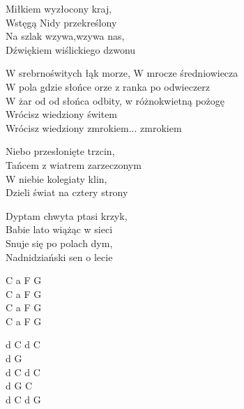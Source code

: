 \begin{text}
    Miłkiem wyzłocony kraj,\\
    Wstęgą Nidy przekreślony\\
    Na szlak wzywa,wzywa nas,\\
    Dźwiękiem wiślickiego dzwonu

    W srebrnoświtych łąk morze, W mrocze średniowiecza\\
    W pola gdzie słońce orze z ranka po odwieczerz\\
    W żar od od słońca odbity, w różnokwietną pożogę\\
    Wrócisz wiedziony świtem\\
    Wrócisz wiedziony zmrokiem... zmrokiem


    Niebo przesłonięte trzcin,\\
    Tańcem z wiatrem zarzeczonym\\
    W niebie kolegiaty klin,\\
    Dzieli świat na cztery strony

    Dyptam chwyta ptasi krzyk,\\
    Babie lato wiążąc w sieci\\
    Snuje się po polach dym,\\
    Nadnidziański sen o lecie
\end{text}
\begin{chord}
    C a F G\\
    C a F G\\
    C a F G\\
    C a F G

    d C d C\\
    d G\\
    d C d C\\
    d G C\\
    d C d G
\end{chord}